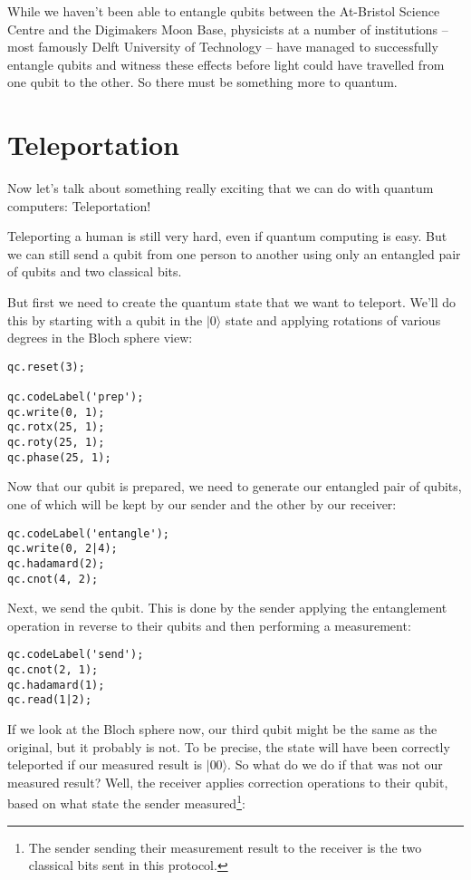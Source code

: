 \documentclass[twocolumn]{article}
\begin{document}
While we haven't been able to entangle qubits between the At-Bristol Science Centre and the Digimakers Moon Base, physicists at a number of institutions -- most famously Delft University of Technology -- have managed to successfully entangle qubits and witness these effects before light could have travelled from one qubit to the other. So there must be something more to quantum.

\section{Teleportation}

Now let's talk about something really exciting that we can do with quantum computers: Teleportation!

Teleporting a human is still very hard, even if quantum computing is easy. But we can still send a qubit from one person to another using only an entangled pair of qubits and two classical bits.

But first we need to create the quantum state that we want to teleport. We'll do this by starting with a qubit in the $|0\rangle$ state and applying rotations of various degrees in the Bloch sphere view:

\begin{lstlisting}
qc.reset(3);

qc.codeLabel('prep');
qc.write(0, 1);
qc.rotx(25, 1);
qc.roty(25, 1);
qc.phase(25, 1);
\end{lstlisting}

Now that our qubit is prepared, we need to generate our entangled pair of qubits, one of which will be kept by our sender and the other by our receiver:

\begin{lstlisting}
qc.codeLabel('entangle');
qc.write(0, 2|4);
qc.hadamard(2);
qc.cnot(4, 2);
\end{lstlisting}

Next, we send the qubit. This is done by the sender applying the entanglement operation in reverse to their qubits and then performing a measurement:

\begin{lstlisting}
qc.codeLabel('send');
qc.cnot(2, 1);
qc.hadamard(1);
qc.read(1|2);
\end{lstlisting}

If we look at the Bloch sphere now, our third qubit might be the same as the original, but it probably is not. To be precise, the state will have been correctly teleported if our measured result is $|00\rangle$. So what do we do if that was not our measured result? Well, the receiver applies correction operations to their qubit, based on what state the sender measured\footnote{The sender sending their measurement result to the receiver is the two classical bits sent in this protocol.}:
\end{document}
